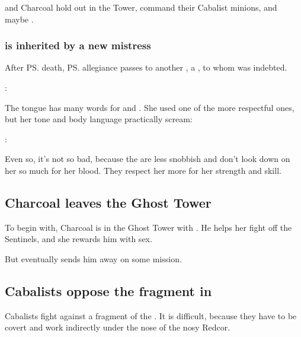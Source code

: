 \begin{garbage}
\Achsah{} and Charcoal hold out in the Tower, command their Cabalist minions, and maybe .





\subsubsection{\Achsah{} is inherited by a new mistress}
After \ps{\Teshrial} death, \ps{\Achsah} allegiance passes to another \resvil, a \Mystraacht{}, to whom \Teshrial{} was indebted. 

\Mystraacht: 

The \resphan{} tongue has many words for  and . 
She used one of the more respectful ones, but her tone and body language practically scream: 

\Achsah: 

Even so, it's not so bad, because the \Mystraacht{} are less snobbish and don't look down on her so much for her blood. 
They respect her more for her strength and skill. 









\subsection{Charcoal leaves the Ghost Tower}
To begin with, Charcoal is in the Ghost Tower with \Achsah. He helps her fight off the Sentinels, and she rewards him with sex. 

But eventually \Achsah{} sends him away on some mission. 









\subsection{Cabalists oppose the \Haskelek{} fragment in \Redce}
\Redcean{} Cabalists fight against a fragment of the \Haskelek. 
It is difficult, because they have to be covert and work indirectly under the nose of the nosy Redcor. 










\end{garbage}
